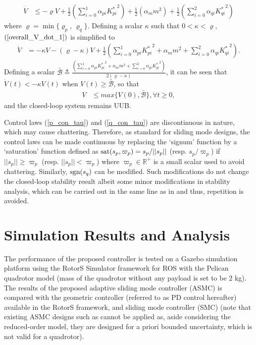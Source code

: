 \begin{align}
    \dot{V} & \leq - \varrho V + \frac{1}{2} \left( \sum \limits_{i=0}^{1} \alpha_{pi} {K^*_{pi}}^2  \right) + \frac{1}{2} \left( \alpha_{m} {m}^2 \right)  + \frac{1}{2}\left( \sum \limits_{i=0}^{2} \alpha_{qi} {K^*_{qi}}^2 \right) \label{overall_V_dot_1}
\end{align}
where $\varrho = \min \{ \varrho_p, \, \varrho_q\}$. Defining a scalar $\kappa$ such that $0 < \kappa < \varrho$, $(\ref{overall_V_dot_1})$ is simplified to
\begin{align}
    \dot{V} &= - \kappa V - (\varrho - \kappa) V  + \frac{1}{2} \left( \sum \limits_{i=0}^{1} \alpha_{pi} {K^*_{pi}}^2  +  \alpha_{m} {m}^2 + \sum \limits_{i=0}^{2} \alpha_{qi} {K^*_{qi}}^2 \right). \label{overall_V_dot_upbound}
\end{align}
Defining a scalar $\mathcal{ \bar B} \triangleq \frac{\left( \sum \limits_{i=0}^{1} \alpha_{pi} {K^*_{pi}}^2  +  \alpha_{m} {m}^2 + \sum \limits_{i=0}^{2} \alpha_{qi} {K^*_{qi}}^2 \right)}{2(\varrho - \kappa)}$, it can be seen that $\dot{V} (t) < - \kappa V (t)$ when $V (t) \geq \mathcal{ \bar B}$, so that
\begin{align}
    V & \leq max \{ V(0), \mathcal{ \bar B} \}, \forall t \geq 0,
\end{align}
and the closed-loop system remains UUB.

\begin{remark}
 Control laws (\ref{p_con_tau}) and (\ref{q_con_tau}) are discontinuous in nature, which may cause chattering. Therefore, as standard for sliding mode designs, the control laws can be made continuous by replacing the `signum' function by a `saturation' function defined as $\operatorname{sat}(s_p,\varpi_p)=s_p/||s_p||$ (resp. $s_p/\varpi_p$) if $|| s_p || \geq \varpi_p$ (resp. $|| s_p || <\varpi_p$) where $\varpi_p \in \mathbb{R}^{+}$ is a small scalar used to avoid chattering. Similarly, $\operatorname{sgn}(s_q)$ can be modified. Such modifications do not change the closed-loop stability result albeit some minor modifications in stability analysis, which can be carried out in the same line as in \cite{roy2019overcoming} and thus, repetition is avoided.
\end{remark}
\section{Simulation Results and Analysis}\label{sec:asmc_sim}
The performance of the proposed controller is tested on a Gazebo simulation platform using the RotorS Simulator framework \cite{rotors_sim_2016} for ROS with the Pelican quadrotor model (mass of the quadrotor without any payload is set to be $2$ kg). The results of the proposed adaptive sliding mode controller (ASMC) is compared with the geometric controller \cite{lee2010geometric} (referred to as PD control hereafter) available in the RotorS framework, and sliding mode controller (SMC) \cite{xu2008sliding} (note that existing ASMC designs such as \cite{mofid2018adaptive} cannot be applied as, aside considering the reduced-order model, they are designed for a priori bounded uncertainty, which is not valid for a quadrotor).

